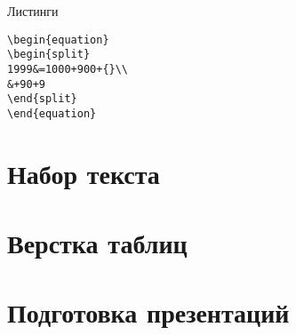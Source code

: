 \documentclass[a4paper, 14pt]{article}
\begin{document}
Листинги

\begin{lstlisting}
\begin{equation}
\begin{split}
1999&=1000+900+{}\\
&+90+9
\end{split}
\end{equation}
\end{lstlisting}

\section{Набор текста}

\section{Верстка таблиц}

\section{Подготовка презентаций}
\end{document}
